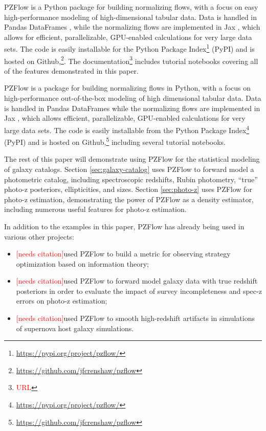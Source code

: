 \documentclass[twocolumn]{aastex631}
\newcommand{\note}[1]{\textsf{\textcolor{red}{#1}}}
\newcommand{\needscite}{\note{[needs citation]}}
\begin{document}
PZFlow is a Python package for building normalizing flows, with a focus on easy high-performance modeling of high-dimensional tabular data.
Data is handled in Pandas DataFrames \citep{pandas}, while the normalizing flows are implemented in Jax \citep{jax}, which allows for efficient, parallelizable, GPU-enabled calculations for very large data sets.
The code is easily installable for the Python Package Index\footnote{\url{https://pypi.org/project/pzflow/}} (PyPI) and is hosted on Github,\footnote{\url{https://github.com/jfcrenshaw/pzflow}}.
The documentation\footnote{\note{URL}} includes tutorial notebooks covering all of the features demonstrated in this paper.

PZFlow is a package for building normalizing flows in Python, with a focus on high-performance out-of-the-box modeling of high dimensional tabular data.
Data is handled in Pandas DataFrames \citep{pandas} while the normalizing flows are implemented in Jax \citep{jax}, which allows efficient, parallelizable, GPU-enabled calculations for very large data sets.
The code is easily installable from the Python Package Index\footnote{\url{https://pypi.org/project/pzflow/}} (PyPI) and is hosted on Github,\footnote{\url{https://github.com/jfcrenshaw/pzflow}} including several tutorial notebooks.

The rest of this paper will demonstrate using PZFlow for the statistical modeling of galaxy catalogs.
Section \ref{sec:galaxy-catalog} uses PZFlow to forward model a photometric catalog, including spectroscopic redshifts, Rubin photometry, ``true'' photo-z posteriors, ellipticities, and sizes.
Section \ref{sec:photo-z} uses PZFlow for photo-z estimation, demonstrating the power of PZFlow as a density estimator, including numerous useful features for photo-z estimation.

In addition to the examples in this paper, PZFlow has already being used in various other projects:
\begin{itemize}
    \item \needscite used PZFlow to build a metric for observing strategy optimization based on information theory;
    \item \needscite used PZFlow to forward model galaxy data with true redshift posteriors in order to evaluate the impact of survey incompleteness and spec-z errors on photo-z estimation;
    \item \needscite used PZFlow to smooth high-redshift artifacts in simulations of supernova host galaxy simulations.
\end{itemize}
\end{document}
